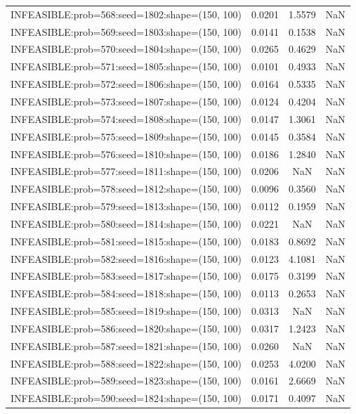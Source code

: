\begin{longtable}{lccc}
INFEASIBLE:prob=568:seed=1802:shape=(150, 100) & 0.0201 &  1.5579 &    NaN \\
INFEASIBLE:prob=569:seed=1803:shape=(150, 100) & 0.0141 &  0.1538 &    NaN \\
INFEASIBLE:prob=570:seed=1804:shape=(150, 100) & 0.0265 &  0.4629 &    NaN \\
INFEASIBLE:prob=571:seed=1805:shape=(150, 100) & 0.0101 &  0.4933 &    NaN \\
INFEASIBLE:prob=572:seed=1806:shape=(150, 100) & 0.0164 &  0.5335 &    NaN \\
INFEASIBLE:prob=573:seed=1807:shape=(150, 100) & 0.0124 &  0.4204 &    NaN \\
INFEASIBLE:prob=574:seed=1808:shape=(150, 100) & 0.0147 &  1.3061 &    NaN \\
INFEASIBLE:prob=575:seed=1809:shape=(150, 100) & 0.0145 &  0.3584 &    NaN \\
INFEASIBLE:prob=576:seed=1810:shape=(150, 100) & 0.0186 &  1.2840 &    NaN \\
INFEASIBLE:prob=577:seed=1811:shape=(150, 100) & 0.0206 &     NaN &    NaN \\
INFEASIBLE:prob=578:seed=1812:shape=(150, 100) & 0.0096 &  0.3560 &    NaN \\
INFEASIBLE:prob=579:seed=1813:shape=(150, 100) & 0.0112 &  0.1959 &    NaN \\
INFEASIBLE:prob=580:seed=1814:shape=(150, 100) & 0.0221 &     NaN &    NaN \\
INFEASIBLE:prob=581:seed=1815:shape=(150, 100) & 0.0183 &  0.8692 &    NaN \\
INFEASIBLE:prob=582:seed=1816:shape=(150, 100) & 0.0123 &  4.1081 &    NaN \\
INFEASIBLE:prob=583:seed=1817:shape=(150, 100) & 0.0175 &  0.3199 &    NaN \\
INFEASIBLE:prob=584:seed=1818:shape=(150, 100) & 0.0113 &  0.2653 &    NaN \\
INFEASIBLE:prob=585:seed=1819:shape=(150, 100) & 0.0313 &     NaN &    NaN \\
INFEASIBLE:prob=586:seed=1820:shape=(150, 100) & 0.0317 &  1.2423 &    NaN \\
INFEASIBLE:prob=587:seed=1821:shape=(150, 100) & 0.0260 &     NaN &    NaN \\
INFEASIBLE:prob=588:seed=1822:shape=(150, 100) & 0.0253 &  4.0200 &    NaN \\
INFEASIBLE:prob=589:seed=1823:shape=(150, 100) & 0.0161 &  2.6669 &    NaN \\
INFEASIBLE:prob=590:seed=1824:shape=(150, 100) & 0.0171 &  0.4097 &    NaN \\

\end{longtable}
